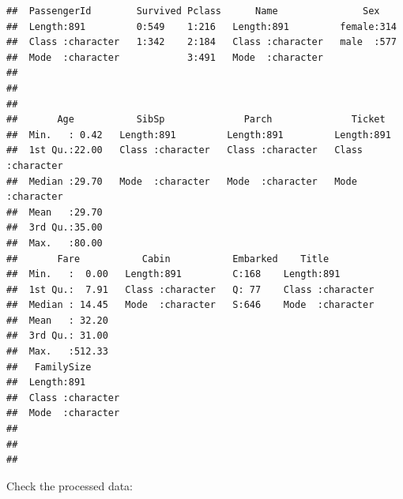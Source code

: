 \documentclass[]{article}
\begin{document}
\begin{verbatim}
##  PassengerId        Survived Pclass      Name               Sex     
##  Length:891         0:549    1:216   Length:891         female:314  
##  Class :character   1:342    2:184   Class :character   male  :577  
##  Mode  :character            3:491   Mode  :character               
##                                                                     
##                                                                     
##                                                                     
##       Age           SibSp              Parch              Ticket         
##  Min.   : 0.42   Length:891         Length:891         Length:891        
##  1st Qu.:22.00   Class :character   Class :character   Class :character  
##  Median :29.70   Mode  :character   Mode  :character   Mode  :character  
##  Mean   :29.70                                                           
##  3rd Qu.:35.00                                                           
##  Max.   :80.00                                                           
##       Fare           Cabin           Embarked    Title          
##  Min.   :  0.00   Length:891         C:168    Length:891        
##  1st Qu.:  7.91   Class :character   Q: 77    Class :character  
##  Median : 14.45   Mode  :character   S:646    Mode  :character  
##  Mean   : 32.20                                                 
##  3rd Qu.: 31.00                                                 
##  Max.   :512.33                                                 
##   FamilySize       
##  Length:891        
##  Class :character  
##  Mode  :character  
##                    
##                    
## 
\end{verbatim}

Check the processed data:
\end{document}
